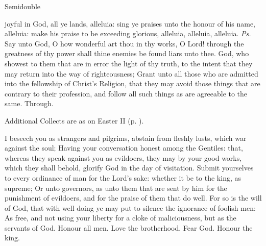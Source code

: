\begin{inhead}
    {Semidouble}
\end{inhead}
\par\noindent
{}


\properantiphonfix

\introit
{} joyful in God, all ye lands, alleluia: sing ye praises unto the honour of his name, alleluia: make his praise to be exceeding glorious, alleluia, alleluia, alleluia. \textit{Ps.} Say unto God, O how wonderful art thou in thy works, O Lord! through the greatness of thy power shall thine enemies be found liars unto thee.
\collect
{} God, who showest to them that are in error the light of thy truth, to the intent that they may return into the way of righteousness; Grant unto all those who are admitted into the fellowship of Christ's Religion, that they may avoid those things that are contrary to their profession, and follow all such things as are agreeable to the same. Through.
\begin{rubric}
    Additional Collects are as on Easter II (p. \pageref{EasterIICollect}).
\end{rubric}
 I beseech you as strangers and pilgrims, abstain from fleshly lusts, which war against the soul; Having your conversation honest among the Gentiles: that, whereas they speak against you as evildoers, they may by your good works, which they shall behold, glorify God in the day of visitation. Submit yourselves to every ordinance of man for the Lord's sake: whether it be to the king, as supreme; Or unto governors, as unto them that are sent by him for the punishment of evildoers, and for the praise of them that do well. For so is the will of God, that with well doing ye may put to silence the ignorance of foolish men: As free, and not using your liberty for a cloke of maliciousness, but as the servants of God. Honour all men. Love the brotherhood. Fear God. Honour the king.
